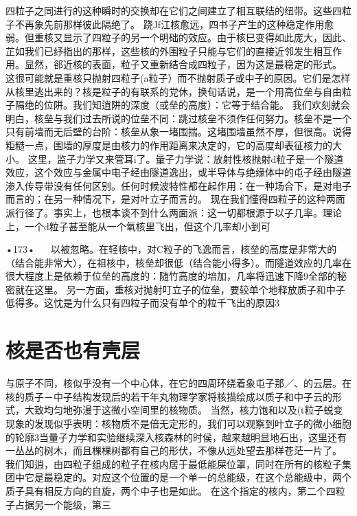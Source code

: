 四粒子之同进行的这种瞬时的交换却在它们之间建立了相互联结的纽带。这些四粒子不再象先前那样彼此隔绝了。
跷Jf江核愈远，四书子产生的这种稳定作用愈弱。但重核又显示了四粒子的另一个明础的效应。由于核巳变得如此庞大，因此、芷如我们已纾指出的那样，这些核的外围粒子只能与它们的直接近邻发生相互作用。显然，郤近核的表面，粒子又重新结合成四粒子，因为这是最稳定的形式。
这很可能就是重核只抛射四粒子(a粒子）而不抛射质子或中子的原因。它们是怎样从核里逃出来的？核是粒子的有联系的党休，换旬话说，是一个用高位垒与自由粒子隔绝的位阱。我们知逍阱的深度（或垒的高度）：它等于结合能。
我们欢刻就会明白，核垒与我们过去所说的位垒不同：跳过核垒不须作任何努力。核垒不是一个只有前墙而无后壁的台阶：核垒从象一堵围揣。这堵围墙虽然不厚，但很高。说得粔糙一点，围墙的厚度是由核力的作用距离来决定的，它的高度却表征核力的大小。
这里，监子力学又来管耳i了。量子力学说：放射性核抛射d粒子是一个隧道效应，这个效应与金属中电子经由隧道逸出，或半导体与绝缘体中的屯子经由隧道渗入传导带没有任何区别。任何时候波特性都在起作用：在一种场合下，是对电子而言的；在另一种情况下，是对叶立子而言的。
现在我们懂得四粒子的这种两面派行径了。事实上，也根本谈不到什么两面派：这一切都根源于以子几率。理论上，一个d粒子甚至能从一个氧核里飞出，但这个几率却小到可

•173•
  
以被忽略。在轻核中，对C粒子的飞逸而言，核垒的高度是非常大的（结合能非常大），在祖核中，核垒却很低（结合能小得多）。而隧道效应的几率在很大程度上是依赖于位垒的高度的：随竹高度的培加，几率将迅速下降9全部的秘密就在这里。
另一方面，重核对抛射叮立子的位垒，要较单个地释放质子和中子低得多。这忱是为什么只有四粒子而没有单个的粒千飞出的原因3

\section{核是否也有壳层}

与原子不同，核似乎没有一个中心体，在它的四周环绕着象屯子那／、的云层。在核的质子－中子结构发现后的若干年丸物理学家将核描绘成以质子和中子云的形式，大致均匀地弥漫于这微小空间里的核物质。
当然，核力饱和以及(t粒子蜕变现象的发现似乎表明：核物质不是倍无定形的，我们可以观察到叶立子的微小细胞的轮廓3当量子力学和实验继续深入核森林的时侯，越来越明显地石出，这里还有一丛丛的树木，而且棵棵树都有自己的形伏，不像从远处望去那样苍茫一片了。
我们知逍，由四粒子组成的粒子在核内居于最低能屎位罩，同时在所有的核粒子集团中它是最稳定的。对应这个位置的是一个单一的总能级，在这个总能级中，两个质子具有相反方向的自旋，两个中子也是如此。
在这个指定的核内，第二个四粒子占据另一个能级，第三

